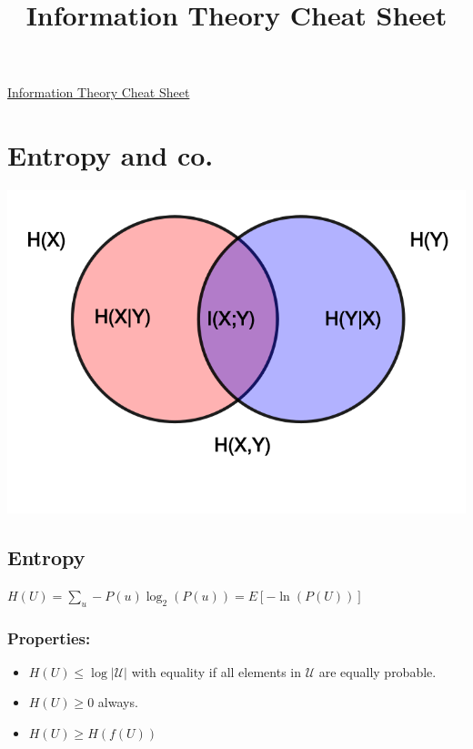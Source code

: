 \documentclass[10pt,a4paper,landscape]{article}
\newcommand{\alphabet}{\mathcal{U}}
\begin{document}
\title{Information Theory Cheat Sheet}

\raggedright
\footnotesize
\sffamily
\begin{multicols*}{4}

\setlength{\premulticols}{1pt}
\setlength{\postmulticols}{1pt}
\setlength{\multicolsep}{1pt}
\setlength{\columnsep}{2pt}

\begin{center}
\Large{\underline{Information Theory Cheat Sheet}}
\end{center}



\section{Entropy and co.}
\begin{colfig}
\centering
\includegraphics[width=\linewidth]{entropy-quantities-venn-diagram.png}
\end{colfig}

\subsection{Entropy}

$H(U) = \sum_u - P(u) \log_2(P(u)) = E[- \ln(P(U))]$

\subsubsection{Properties:}
\begin{itemize}
	\item $H(U) \leq \log | \alphabet |$ with equality if all elements in $\alphabet$ are equally probable.
	\item $H(U) \geq 0$ always.
	\item $H(U) \geq H(f(U))$
\end{itemize}


\end{multicols*}
\end{document}
